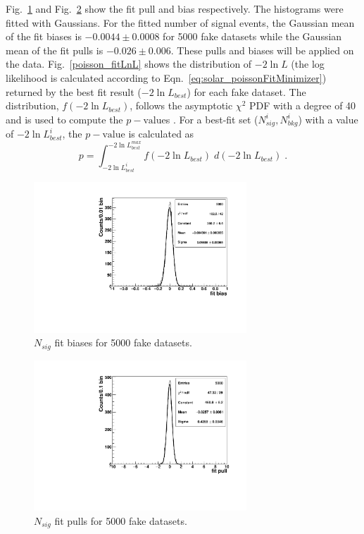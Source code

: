 Fig.~\ref{poisson_fitBias} and Fig.~\ref{poisson_fitPull} show the fit pull and bias respectively. The histograms were fitted with Gaussians. For the fitted number of signal events, the Gaussian mean of the fit biases is $-0.0044\pm0.0008$ for 5000 fake datasets while the Gaussian mean of the fit pulls is $-0.026\pm0.006$. These pulls and biases will be applied on the data. Fig.~\ref{poisson_fitLnL} shows the distribution of $-2\ln L$ (the log likelihood is calculated according to Eqn.~\ref{eq:solar_poissonFitMinimizer}) returned by the best fit result ($-2\ln L_{best}$) for each fake dataset. The distribution, $f({-2\ln L_{best}})$, follows the asymptotic $\chi^2$ PDF with a degree of 40 and is used to compute the $p-\mathrm{value}$s \cite{pdg2020}. For a best-fit set ($N^i_{sig},N^i_{bkg}$) with a value of $-2\ln L^i_{best}$, the $p-\mathrm{value}$ is calculated as
\begin{equation*}
p=\int_{-2\ln L^{i}_{best}}^{-2\ln L^{max}_{best}}f({-2\ln L_{best}}) \; d(-2\ln L_{best}) \; .
\end{equation*}


\begin{figure}[!htb]
	\centering
	\includegraphics[width=8cm]{ensemble_fitBias.pdf}
	\caption{$N_{sig}$ fit biases for 5000 fake datasets. \label{poisson_fitBias}}
\end{figure} 

\begin{figure}[!htb]
	\centering
	\includegraphics[width=8cm]{ensemble_fitPull.pdf}
	\caption{$N_{sig}$ fit pulls for 5000 fake datasets. \label{poisson_fitPull}}
\end{figure} 


